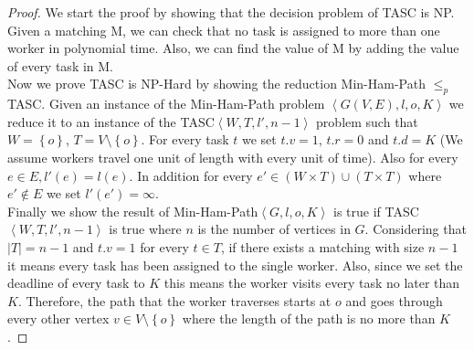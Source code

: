 \begin{proof}
We start the proof by showing that the decision problem of TASC is NP. Given a matching M, we can check that no task is assigned to more than one worker in polynomial time. Also, we can find the value of M by adding the value of every task in M.\\

Now we prove TASC is NP-Hard by showing the reduction Min-Ham-Path $\leq_p$ TASC. Given an instance of the Min-Ham-Path problem $\left\langle G(V,E), l, o, K \right\rangle$ we reduce it to an instance of the TASC$\left\langle W, T, l', n-1 \right\rangle$ problem such that $W = \left\{ o \right\}$, $T = V \setminus \left\{ o \right\}$. For every task $t$ we set $t.v = 1$, $t.r = 0$ and $t.d = K$ (We assume workers travel one unit of length with every unit of time). Also for every $e \in E, l'(e) = l(e)$. In addition for every $e' \in \left( W \times T \right) \cup \left( T \times T \right) $ where $e' \not\in E$ we set $l'(e') = \infty$.\\ 

Finally we show the result of Min-Ham-Path$\left\langle G, l, o, K \right\rangle$ is true if TASC$\left\langle W, T, l', n-1 \right\rangle$ is true where $n$ is the number of vertices in $G$. Considering that $\left\vert T \right\vert = n - 1$ and $t.v = 1$ for every $t \in T$, if there exists a matching with size $n - 1$ it means every task has been assigned to the single worker. Also, since we set the deadline of every task to $K$ this means the worker visits every task no later than $K$. Therefore, the path that the worker traverses starts at $o$ and goes through every other vertex $v \in V \setminus \left\{ o \right\}$ where the length of the path is no more than $K$.
\end{proof}